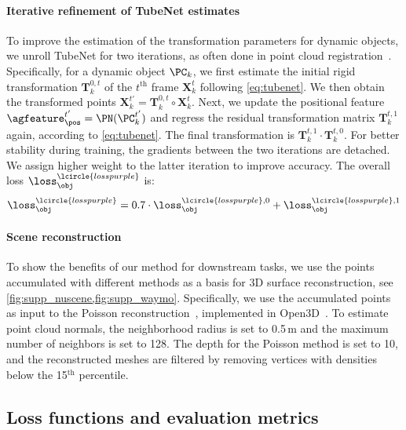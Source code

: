 \paragraph{Iterative refinement of TubeNet estimates}
To improve the estimation of the transformation parameters for dynamic objects, we unroll TubeNet for two iterations, as often done in point cloud registration~\cite{yew2020rpm,gojcic2020multiview}. Specifically, for a dynamic object $\PC_k$, we first estimate the initial rigid transformation $\mathbf{T}_k^{0, t}$ of the $t^\text{th}$ frame $\mathbf{X}_k^t$ following \cref{eq:tubenet}. We then obtain the transformed points $\mathbf{X}_k^{t'} = \mathbf{T}_k^{0, t} \circ \mathbf{X}_k^t$. Next, we update the positional feature $\agfeature_\pos^{t'} = \PN(\PC_k^{t'})$ and regress the residual transformation matrix $\mathbf{T}_k^{t, 1}$ again, according to \cref{eq:tubenet}. The final transformation is $\mathbf{T}_k^{t, 1}\cdot\mathbf{T}_k^{t, 0}$. For better stability during training, the gradients between the two iterations are detached. We assign higher weight to the latter iteration to improve accuracy. The overall loss $\loss_\obj^\lcircle{losspurple}$ is:
\begin{equation}
    \loss_\obj^\lcircle{losspurple} = 0.7\cdot \loss_\obj^{\lcircle{losspurple},0} +  \loss_\obj^{\lcircle{losspurple},1}
\end{equation}

\paragraph{Scene reconstruction}
To show the benefits of our method for downstream tasks, we use the points accumulated with different methods as a basis for 3D surface reconstruction, see \cref{fig:supp_nuscene,fig:supp_waymo}. Specifically, we use the accumulated points as input to the Poisson reconstruction~\cite{kazhdan2006poisson}, implemented in Open3D~\cite{Zhou2018}. To estimate point cloud normals, the neighborhood radius is set to 0.5$\,$m and the maximum number of neighbors is set to 128. The depth for the Poisson method is set to 10, and the reconstructed meshes are filtered by removing vertices with densities below the 15$^\text{th}$ percentile. 

\subsection{Loss functions and evaluation metrics}
\label{sec:supp_loss}
